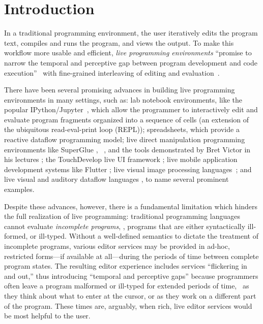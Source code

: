 \newcommand{\introSec}{Introduction}
\section{\protect\introSec} %
\label{sec:intro}

In a traditional programming environment, the user iteratively edits the program
text, compiles and runs the program, and views the output.
%
To make this workflow more usable and efficient, \emph{live programming
environments} ``promise to narrow the temporal and perceptive gap between
program development and code execution''~\cite{burckhardt2013s} with
fine-grained interleaving of editing and evaluation~\cite{DBLP:journals/vlc/Tanimoto90,DBLP:conf/icse/Tanimoto13}.


There have been several promising advances in building live programming
environments in many settings, such as:
%
{lab notebook environments}, like the popular
IPython/Jupyter~\cite{PER-GRA:2007}, which allow the programmer to interactively
edit and evaluate program fragments organized into a sequence of cells (an
extension of the ubiquitous read-eval-print loop (REPL));
%
spreadsheets, which provide a reactive dataflow programming model;
%
live direct manipulation programming environments like SuperGlue
\cite{McDirmid:2007}, \sns{}~\cite{sns-pldi,sns-uist}, and the tools
demonstrated by Bret Victor in his lectures \cite{victor2012inventing};
%
the TouchDevelop live UI framework \cite{burckhardt2013s};
%
live mobile application development systems like Flutter \cite{flutter};
%
live visual image processing languages~\cite{DBLP:journals/vlc/Tanimoto90};
%
and live visual and auditory dataflow languages \cite{DBLP:conf/vl/BurnettAW98},
to name several prominent examples.

Despite these advances, however, there is a fundamental limitation which hinders
the full realization of live programming: traditional programming languages
cannot evaluate \emph{incomplete programs}, \ie{}, programs that are either
syntactically ill-formed, or ill-typed.
%
Without a well-defined semantics to dictate the treatment of incomplete
programs, various editor services may be provided in ad-hoc, restricted
forms---if available at all---during the periods of time between complete
program states.
%
%
%
The resulting editor experience includes services ``flickering in and out,''
thus introducing ``temporal and perceptive gaps'' because programmers often
leave a program malformed or ill-typed for extended periods of time, \eg{}~as
they think about what to enter at the cursor, or as they work on a different
part of the program.
%
These times are, arguably, when rich, live editor services would be most helpful
to the user.

